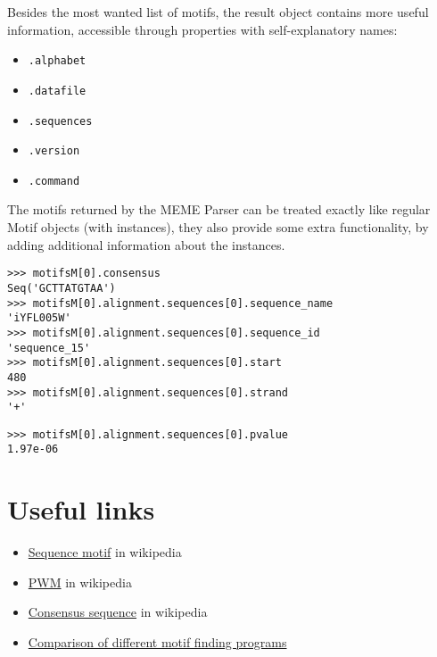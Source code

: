 Besides the most wanted list of motifs, the result object contains more useful information, accessible through properties with self-explanatory names:
\begin{itemize}
\item \verb|.alphabet|
\item \verb|.datafile|
\item \verb|.sequences|
\item \verb|.version|
\item \verb|.command|
\end{itemize}

The motifs returned by the MEME Parser can be treated exactly like regular
Motif objects (with instances), they also provide some extra
functionality, by adding additional information about the instances.

\begin{verbatim}
>>> motifsM[0].consensus
Seq('GCTTATGTAA')
>>> motifsM[0].alignment.sequences[0].sequence_name
'iYFL005W'
>>> motifsM[0].alignment.sequences[0].sequence_id
'sequence_15'
>>> motifsM[0].alignment.sequences[0].start
480
>>> motifsM[0].alignment.sequences[0].strand
'+'
\end{verbatim}
\begin{verbatim}
>>> motifsM[0].alignment.sequences[0].pvalue
1.97e-06
\end{verbatim}


\section{Useful links}
\label{sec:links}


\begin{itemize}
\item \href{https://en.wikipedia.org/wiki/Sequence_motif}{Sequence motif} in wikipedia
\item \href{https://en.wikipedia.org/wiki/Position_weight_matrix}{PWM} in wikipedia
\item \href{https://en.wikipedia.org/wiki/Consensus_sequence}{Consensus sequence} in wikipedia
\item \href{http://bio.cs.washington.edu/assessment/}{Comparison of different motif finding programs}
\end{itemize}
